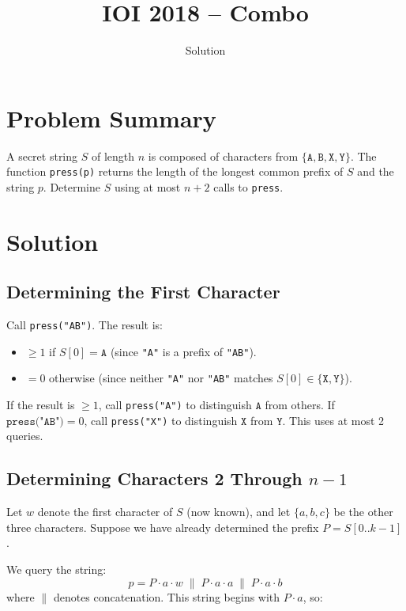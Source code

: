 \documentclass[11pt,a4paper]{article}
\title{IOI 2018 -- Combo}
\author{Solution}
\date{}
\begin{document}
\maketitle

\section{Problem Summary}

A secret string $S$ of length $n$ is composed of characters from $\{\texttt{A}, \texttt{B}, \texttt{X}, \texttt{Y}\}$. The function \texttt{press(p)} returns the length of the longest common prefix of $S$ and the string $p$. Determine $S$ using at most $n+2$ calls to \texttt{press}.

\section{Solution}

\subsection{Determining the First Character}
Call \texttt{press("AB")}. The result is:
\begin{itemize}
  \item $\ge 1$ if $S[0] = \texttt{A}$ (since \texttt{"A"} is a prefix of \texttt{"AB"}).
  \item $= 0$ otherwise (since neither \texttt{"A"} nor \texttt{"AB"} matches $S[0] \in \{\texttt{X}, \texttt{Y}\}$).
\end{itemize}
If the result is $\ge 1$, call \texttt{press("A")} to distinguish $\texttt{A}$ from others. If $\texttt{press("AB")} = 0$, call \texttt{press("X")} to distinguish $\texttt{X}$ from $\texttt{Y}$. This uses at most 2 queries.

\subsection{Determining Characters 2 Through $n-1$}

Let $w$ denote the first character of $S$ (now known), and let $\{a, b, c\}$ be the other three characters. Suppose we have already determined the prefix $P = S[0..k-1]$.

We query the string:
\[
  p = P \cdot a \cdot w \;\|\; P \cdot a \cdot a \;\|\; P \cdot a \cdot b
\]
where $\|$ denotes concatenation. This string begins with $P \cdot a$, so:
\end{document}
